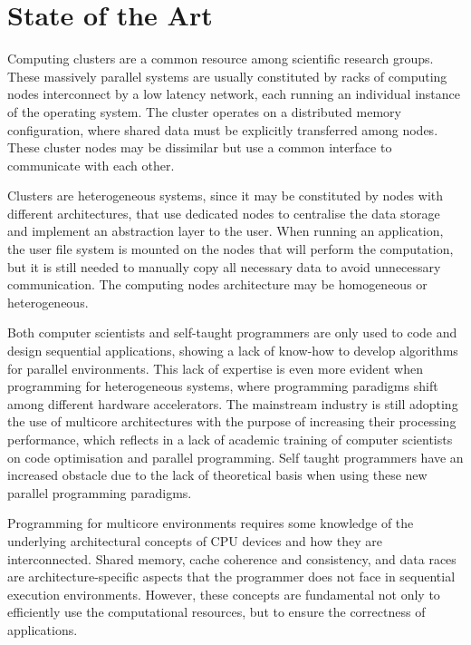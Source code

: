 
\chapter{State of the Art}
\label{state_of_the_art}

Computing clusters are a common resource among scientific research groups. These massively parallel systems are usually constituted by racks of computing nodes interconnect by a low latency network, each running an individual instance of the operating system. The cluster operates on a distributed memory configuration, where shared data must be explicitly transferred among nodes. These cluster nodes may be dissimilar but use a common interface to communicate with each other.

Clusters are heterogeneous systems, since it may be constituted by nodes with different architectures, that use dedicated nodes to centralise the data storage and implement an abstraction layer to the user. When running an application, the user file system is mounted on the nodes that will perform the computation, but it is still needed to manually copy all necessary data to avoid unnecessary communication. The computing nodes architecture may be homogeneous or heterogeneous.

Both computer scientists and self-taught programmers are only used to code and design sequential applications, showing a lack of know-how to develop algorithms for parallel environments. This lack of expertise is even more evident when programming for heterogeneous systems, where programming paradigms shift among different hardware accelerators. The mainstream industry is still adopting the use of multicore architectures with the purpose of increasing their processing performance, which reflects in a lack of academic training of computer scientists on code optimisation and parallel programming. Self taught programmers have an increased obstacle due to the lack of theoretical basis when using these new parallel programming paradigms.

Programming for multicore environments requires some knowledge of the underlying architectural concepts of CPU devices and how they are interconnected. Shared memory, cache coherence and consistency, and data races are architecture-specific aspects that the programmer does not face in sequential execution environments. However, these concepts are fundamental not only to efficiently use the computational resources, but to ensure the correctness of applications.

